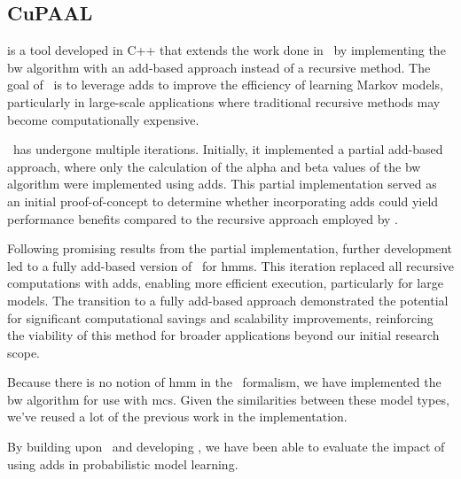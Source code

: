 \subsection{CuPAAL}\label{subsec:cupaal}
\Cupaal is a tool developed in C++ that extends the work done in \Jajapy\ by implementing the \gls{bw} algorithm with an \gls{add}-based approach instead of a recursive method.
The goal of \Cupaal\ is to leverage \glspl{add} to improve the efficiency of learning Markov models, particularly in large-scale applications where traditional recursive methods may become computationally expensive.

\Cupaal\ has undergone multiple iterations.
Initially, it implemented a partial \gls{add}-based approach, where only the calculation of the alpha and beta values of the \gls{bw} algorithm were implemented using \glspl{add}.
This partial implementation served as an initial proof-of-concept to determine whether incorporating \glspl{add} could yield performance benefits compared to the recursive approach employed by \Jajapy.

Following promising results from the partial implementation, further development led to a fully \gls{add}-based version of \Cupaal\ for \glspl{hmm}.
This iteration replaced all recursive computations with \glspl{add}, enabling more efficient execution, particularly for large models.
The transition to a fully \gls{add}-based approach demonstrated the potential for significant computational savings and scalability improvements, reinforcing the viability of this method for broader applications beyond our initial research scope.

Because there is no notion of \gls{hmm} in the \Prism\ formalism, we have implemented the \gls{bw} algorithm for use with \glspl{mc}.
Given the similarities between these model types, we've reused a lot of the previous work in the implementation.

By building upon \Jajapy\ and developing \Cupaal, we have been able to evaluate the impact of using \glspl{add} in probabilistic model learning.

